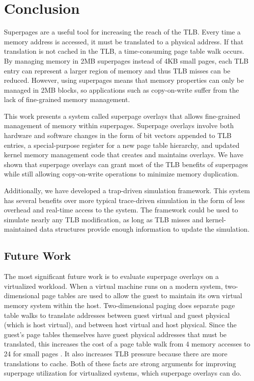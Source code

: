 \chapter{Conclusion}

Superpages are a useful tool for increasing the reach of the TLB. Every time a memory address is accessed, it must be translated to a physical address. If that translation is not cached in the TLB, a time-consuming page table walk occurs. By managing memory in 2MB superpages instead of 4KB small pages, each TLB entry can represent a larger region of memory and thus TLB misses can be reduced. However, using superpages means that memory properties can only be managed in 2MB blocks, so applications such as copy-on-write suffer from the lack of fine-grained memory management.

This work presents a system called superpage overlays that allows fine-grained management of memory within superpages. Superpage overlays involve both hardware and software changes in the form of bit vectors appended to TLB entries, a special-purpose register for a new page table hierarchy, and updated kernel memory management code that creates and maintains overlays. We have shown that superpage overlays can grant most of the TLB benefits of superpages while still allowing copy-on-write operations to minimize memory duplication.

Additionally, we have developed a trap-driven simulation framework. This system has several benefits over more typical trace-driven simulation in the form of less overhead and real-time access to the system. The framework could be used to simulate nearly any TLB modification, as long as TLB misses and kernel-maintained data structures provide enough information to update the simulation.

\section{Future Work}
The most significant future work is to evaluate superpage overlays on a virtualized workload. When a virtual machine runs on a modern system, two-dimensional page tables are used to allow the guest to maintain its own virtual memory system within the host. Two-dimensional paging does separate page table walks to translate addresses between guest virtual and guest physical (which is host virtual), and between host virtual and host physical. Since the guest's page tables themselves have guest physical addresses that must be translated, this increases the cost of a page table walk from 4 memory accesses to 24 for small pages \cite{Bhargava}. It also increases TLB pressure because there are more translations to cache. Both of these facts are strong arguments for improving superpage utilization for virtualized systems, which superpage overlays can do.

